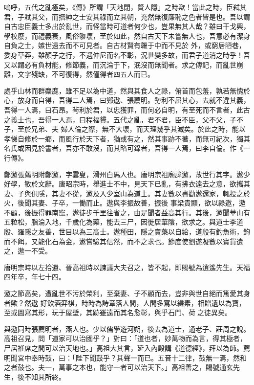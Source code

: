 
\begin{pinyinscope}

 嗚呼，五代之亂極矣，《傳》所謂「天地閉，賢人隱」之時歟！當此之時，臣弒其君，子弒其父，而搢紳之士安其祿而立其朝，充然無復廉恥之色者皆是也。吾以謂自古忠臣義士多出於亂世，而怪當時可道者何少也，豈果無其人哉？雖曰干戈興，學校廢，而禮義衰，風俗隳壞，至於如此，然自古天下未嘗無人也，吾意必有潔身自負之士，嫉世遠去而不可見者。自古材賢有韞于中而不見於
 外，或窮居陋巷，委身草莽，雖顏子之行，不遇仲尼而名不彰，況世變多故，而君子道消之時乎！吾又以謂必有負材能，修節義，而沉淪于下，泯沒而無聞者。求之傳記，而亂世崩離，文字殘缺，不可復得，然僅得者四五人而已。



 處乎山林而群麋鹿，雖不足以為中道，然與其食人之祿，俯首而包羞，孰若無愧於心，放身而自得，吾得二人焉，曰鄭遨、張薦明。勢利不屈其心，去就不違其義，吾得一人焉，曰石昂。茍利於君，以忠獲罪，而何必自明，有至死而不言者，此古之義士也，吾得一人焉，曰程福贇。五代之亂，君不君，臣不臣，父不父，子不子，至於兄弟、夫
 婦人倫之際，無不大壞，而天理幾乎其滅矣。於此之時，能以孝悌自修於一鄉，而風行於天下者，猶或有之，然其事跡不著，而無可紀次，獨其名氏或因見於書者，吾亦不敢沒，而其略可錄者，吾得一人焉，曰李自倫。作《一行傳》。



 鄭遨張薦明附鄭遨，字雲叟，滑州白馬人也。唐明宗祖廟諱遨，故世行其字。遨少好學，敏於文辭。唐昭宗時，舉進士不中，見天下已亂，有拂衣遠去之意，欲攜其妻、子與俱隱，其妻不從，遨及入少室山為道士。其妻數以書勸遨還家，輒投之於火，後聞其妻、子卒，一慟而止。遨與李振故善，振後
 事梁貴顯，欲以祿遨，遨不顧，後振得罪南竄，遨徒步千里往省之，由是聞者益高其行。其後，遨聞華山有五粒松，脂淪入地，千歲化為藥，能去三尸，因徙居華陰，欲求之。與道士李道殷、羅隱之友善，世目以為三高士。遨種田，隱之賣藥以自給，道殷有釣魚術，鉤而不餌，又能化石為金，遨嘗驗其信然，而不之求也。節度使劉遂凝數以寶貨遺之，遨一不受。



 唐明宗時以左拾遺、晉高祖時以諫議大夫召之，皆不起，即賜號為逍遙先生。天福四年卒，年七十四。



 遨之節高矣，遭亂世不污於榮利，至棄妻、子不顧而去，豈非與世自絕而篤愛其身者歟？然遨
 好飲酒弈棋，時時為詩章落人間，人間多寫以縑素，相贈遺以為寶，至或圖寫其形，玩于屋壁，其跡雖遠而其名愈彰，與乎石門、荷之徒異矣。



 與遨同時張薦明者，燕人也。少以儒學遊河朔，後去為道士，通老子、莊周之說。高祖召見，問「道家可以治國乎？」對曰：「道也者，妙萬物而為言，得其極者，尸居袵席之間可以治天地也。」高祖大其言，延入內殿講《道德經》，拜以為師。薦明聞宮中奉時鼓，曰：「陛下聞鼓乎？其聲一而已。五音十二律，鼓無一焉，然和之者鼓也。夫一，萬事之本也，能守一者可以治天下。」高祖善之，賜號通玄先生，後不知其所終。




\end{pinyinscope}
